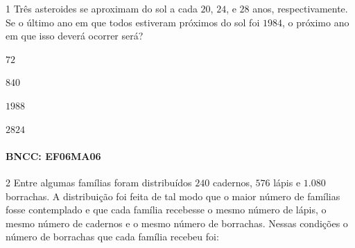 


\num{1}  Três asteroides se aproximam do sol a cada $20$, $24$, e $28$ anos,
respectivamente. Se o último ano em que todos estiveram próximos do sol
foi $1984$, o próximo ano em que isso deverá ocorrer será?

\begin{escolha}
\item
  $72$
\item
  $840$
\item
  $1988$
\item
  $2824$
\end{escolha}

\paragraph{BNCC: EF06MA06 }


\num{2}  Entre algumas famílias foram distribuídos $240$ cadernos, $576$ lápis e
$1.080$ borrachas. A distribuição foi feita de tal modo que o maior número
de famílias fosse contemplado e que cada família recebesse o mesmo
número de lápis, o mesmo número de cadernos e o mesmo número de
borrachas. Nessas condições o número de borrachas que cada família
recebeu foi:

